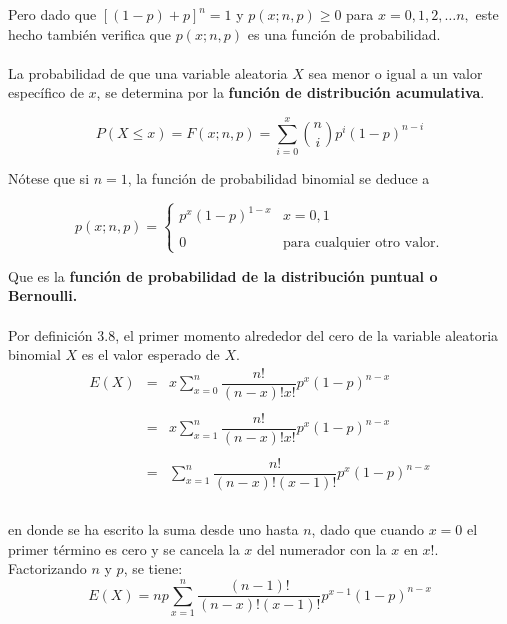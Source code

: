 Pero dado que $[(1-p)+p]^n = 1$ y $p(x;n,p)\geq 0$ para $x=0,1,2,\ldots n,$ este hecho también verifica que $p(x;n,p)$ es una función de probabilidad.\\\\

La probabilidad de que una variable aleatoria $X$ sea menor o igual a un valor específico de $x$, se determina por la \textbf{función de distribución acumulativa}.

\begin{tcolorbox}[colback=white]
    $$P(X\leq x) = F(x;n,p) = \sum_{i=0}^x {n\choose i} p^i (1-p)^{n-i}$$
\end{tcolorbox}

Nótese que si $n=1$, la función de probabilidad binomial se deduce a

\begin{tcolorbox}[colback=white]
    $$p(x;n,p)=\left\{\begin{array}{ll}
	p^x(1-p)^{1-x} & x = 0,1\\\\
	0 & \mbox{para cualquier otro valor}.
    \end{array}\right.$$
\end{tcolorbox}

Que es la \textbf{función de probabilidad de la distribución puntual o Bernoulli.}\\\\

Por definición 3.8, el primer momento alrededor del cero de la variable aleatoria binomial $X$ es el valor esperado de $X$.
$$\begin{array}{rcl}
    E(X) & = & x\sum\limits_{x=0}^n \dfrac{n!}{(n-x)!x!} p^x(1-p)^{n-x}\\\\
	 & = & x\sum\limits_{x=1}^n \dfrac{n!}{(n-x)!x!} p^x(1-p)^{n-x}\\\\
	 & = & \sum\limits_{x=1}^n \dfrac{n!}{(n-x)!(x-1)!} p^x(1-p)^{n-x}\\\\
\end{array}$$

en donde se ha escrito la suma desde uno hasta $n$, dado que cuando $x=0$ el primer término es cero y se cancela la $x$ del numerador con la $x$ en $x!$. Factorizando $n$ y $p$, se tiene: 
$$E(X)=np\sum_{x=1}^n \dfrac{(n-1)!}{(n-x)!(x-1)!}p^{x-1}(1-p)^{n-x}$$

